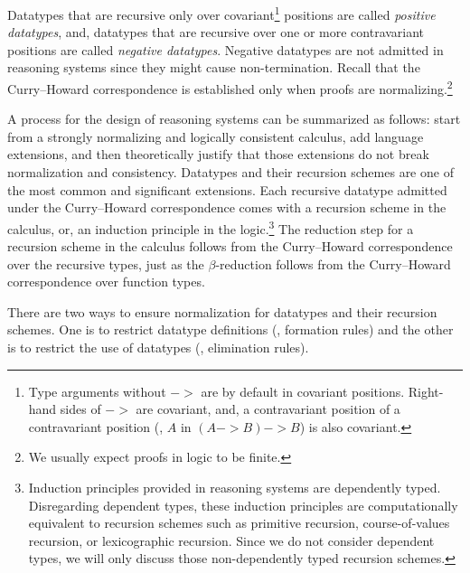 Datatypes that are recursive only over covariant\footnote{Type arguments
        without $->$ are by default in covariant positions. Right-hand sides
        of $->$ are covariant, and, a contravariant position of
        a contravariant position (\eg, $A$ in $(A -> B) -> B$) is
        also covariant.}
positions are called \emph{positive datatypes}, and, datatypes
that are recursive over one or more contravariant positions are
called \emph{negative datatypes}.
Negative datatypes are not admitted
in reasoning systems since they might cause non-termination.
Recall that the Curry--Howard correspondence is established
only when proofs are normalizing.\footnote{
	We usually expect proofs in logic to be finite.}

A process for the design of reasoning systems can be summarized as follows: 
start from a strongly normalizing and logically consistent calculus,
add language extensions, and then theoretically justify that those extensions
do not break normalization and consistency. Datatypes and their recursion
schemes are one of the most common and significant extensions.
Each recursive datatype admitted under the Curry--Howard correspondence
comes with a recursion scheme in the calculus, or, an induction principle
in the logic.\footnote{
        Induction principles provided in reasoning systems are
        dependently typed. Disregarding dependent types, these
        induction principles are computationally equivalent to
        recursion schemes such as primitive recursion,
        course-of-values recursion, or lexicographic recursion.
        Since we do not consider dependent types, we will only discuss
        those non-dependently typed recursion schemes.}
The reduction step for a recursion scheme in the calculus follows from
the Curry--Howard correspondence over the recursive types, just as
the $\beta$-reduction follows from the Curry--Howard correspondence
over function types.

There are two ways to ensure normalization for datatypes and their recursion
schemes. One is to restrict datatype definitions (\ie, formation rules) and
the other is to restrict the use of datatypes (\ie, elimination rules).

